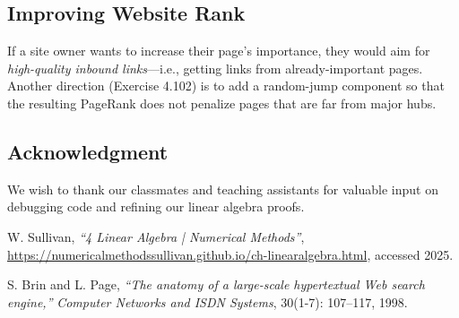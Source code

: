 \documentclass{article}
\begin{document}
\subsection*{Improving Website Rank}      
If a site owner wants to increase their page's importance, they would aim for \emph{high-quality inbound links}---i.e., 
getting links from already-important pages. Another direction (Exercise 4.102) is to add a random-jump component 
so that the resulting PageRank does not penalize pages that are far from major hubs.

\subsection*{Acknowledgment}
We wish to thank our classmates and teaching assistants for valuable input on debugging code and refining 
our linear algebra proofs.

\begin{thebibliography}{9}

W. Sullivan,
\textit{``4 Linear Algebra | Numerical Methods''},
\url{https://numericalmethodssullivan.github.io/ch-linearalgebra.html}, 
accessed 2025.

S. Brin and L. Page,
\textit{``The anatomy of a large-scale hypertextual Web search engine,''}
\emph{Computer Networks and ISDN Systems}, 30(1-7): 107--117, 1998.

\end{thebibliography}
\end{document}
